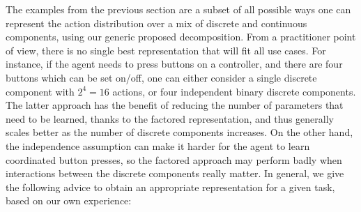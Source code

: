 \documentclass[letterpaper]{article} \usepackage{aaai20}  \usepackage{times}  \usepackage{helvet} \usepackage{courier}  \usepackage[hyphens]{url}  \usepackage{graphicx} \urlstyle{rm} \def\UrlFont{\rm}  \usepackage{graphicx}  \usepackage[section]{placeins}
\begin{document}
The examples from the previous section are a subset of all possible ways one can represent the action distribution over a mix of discrete and continuous components, using our generic proposed decomposition.
From a practitioner point of view, there is no single best representation that will fit all use cases.
For instance, if the agent needs to press buttons on a controller, and there are four buttons which can be set on/off, one can either consider a single discrete component with $2^4 = 16$ actions, or four independent binary discrete components.
The latter approach has the benefit of reducing the number of parameters that need to be learned, thanks to the factored representation, and thus generally scales better as the number of discrete components increases.
On the other hand, the independence assumption can make it harder for the agent to learn coordinated button presses, so the factored approach may perform badly when interactions between the discrete components really matter.
In general, we give the following advice to obtain an appropriate representation for a given task, based on our own experience:
\end{document}
